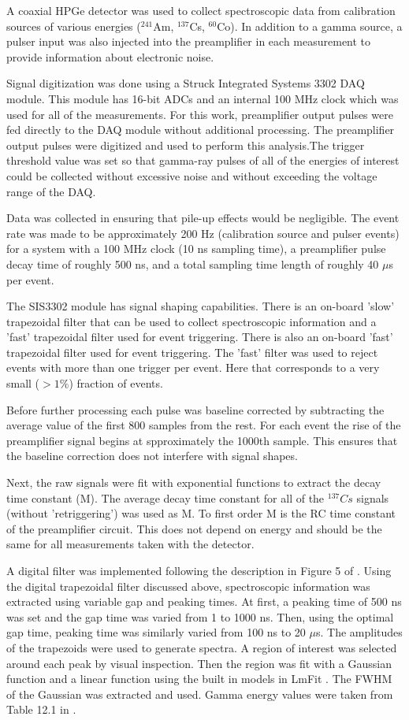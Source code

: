 A coaxial HPGe detector was used to collect spectroscopic data from calibration sources of various energies (${}^{241}$Am, ${}^{137}$Cs, ${}^{60}$Co). In addition to a gamma source, a pulser input was also injected into the preamplifier in each measurement to provide information about electronic noise. 

Signal digitization was done using a Struck Integrated Systems 3302 DAQ module. This module has 16-bit ADCs and an internal 100 MHz clock which was used for all of the measurements. For this work, preamplifier output pulses were fed directly to the DAQ module without additional processing. The preamplifier output pulses were digitized and used to perform this analysis.The trigger threshold value was set so that gamma-ray pulses of all of the energies of interest could be collected without excessive noise and without exceeding the voltage range of the DAQ.

Data was collected in ensuring that pile-up effects would be negligible. The event rate was made to be approximately 200 Hz (calibration source and pulser events) for a system with a 100 MHz clock (10 ns sampling time), a preamplifier pulse decay time of roughly 500 ns, and a total sampling time length of roughly 40 $\mu$s per event.

The SIS3302 module has signal shaping capabilities. There is an on-board 'slow' trapezoidal filter that can be used to collect spectroscopic information and a 'fast' trapezoidal filter used for event triggering. There is also an on-board 'fast' trapezoidal filter used for event triggering. The 'fast' filter was used to reject events with more than one trigger per event. Here that corresponds to a very small ($>1\%$) fraction of events. 

Before further processing each pulse was baseline corrected by subtracting the average value of the first 800 samples from the rest. For each event the rise of the preamplifier signal begins at spproximately the 1000th sample. This ensures that the baseline correction does not interfere with signal shapes. 

Next, the raw signals were fit with exponential functions to extract the decay time constant (M). The average decay time constant for all of the ${}^{137}Cs$ signals (without 'retriggering') was used as M. To first order M is the RC time constant of the preamplifier circuit. This does not depend on energy and should be the same for all measurements taken with the detector.

A digital filter was implemented following the description in Figure 5 of \cite{Jordanov}. Using the digital trapezoidal filter discussed above, spectroscopic information was extracted using variable gap and peaking times. At first, a peaking time of 500 ns was set and the gap time was varied from 1 to 1000 ns. Then, using the optimal gap time, peaking time was similarly varied from 100 ns to 20 $\mu$s. The amplitudes of the trapezoids were used to generate spectra. A region of interest was selected around each peak by visual inspection. Then the region was fit with a Gaussian function and a linear function using the built in models in LmFit \cite{LMFIT}. The FWHM of the Gaussian was extracted and used. Gamma energy values were taken from Table 12.1 in \cite{Knoll} .


